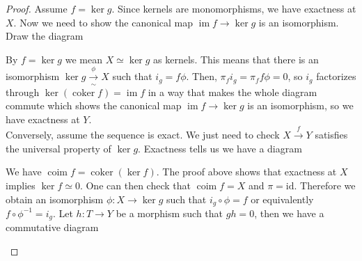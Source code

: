 \documentclass{article}
\newcommand{\id}{\mathrm{id}}
\DeclareMathOperator{\coker}{coker}
\DeclareMathOperator{\im}{im}
\DeclareMathOperator{\coim}{coim}
\theoremstyle{plain}
\theoremstyle{definition}
\theoremstyle{remark}
\begin{document}
\begin{proof}
    Assume $f = \ker g$. Since kernels are monomorphisms, we have exactness at $X$. Now we need to show the canonical map $\im f \to \ker g$ is an isomorphism. Draw the diagram
    \begin{center}
    \end{center}
    By $f = \ker g$ we mean $X \simeq \ker g$ as kernels. This means that there is an isomorphism $\ker g \xrightarrow[\sim]{\phi} X$ such that $i_g = f\phi$. Then, $\pi_f i_g = \pi_f f \phi = 0$, so $i_g$ factorizes through $\ker(\coker f) = \im f$ in a way that makes the whole diagram commute which shows the canonical map $\im f \to \ker g$ is an isomorphism, so we have exactness at $Y$. \\
    Conversely, assume the sequence is exact. We just need to check $X \xrightarrow{f} Y$ satisfies the universal property of $\ker g$. Exactness tells us we have a diagram
    \begin{center}
    \end{center}
    We have $\coim f = \coker(\ker f)$. The proof above shows that exactness at $X$ implies $\ker f \simeq 0$. One can then check that $\coim f = X$ and $\pi = \id$. Therefore we obtain an isomorphism $\phi : X \to \ker g$ such that $i_g \circ \phi = f$ or equivalently $f \circ \phi^{-1} = i_g$. Let $h : T \to Y$ be a morphism such that $gh = 0$, then we have a commutative diagram
    \begin{center}
        \begin{tikzcd}

\end{tikzcd}
\end{center}
\end{proof}
\end{document}
